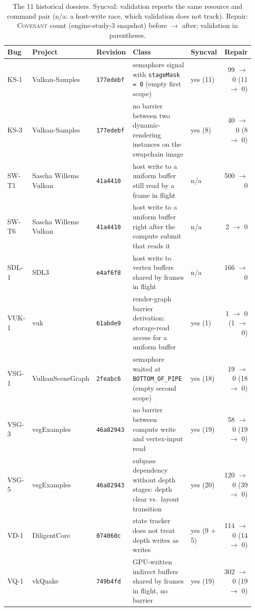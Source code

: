 \documentclass[acmtog,anonymous,review]{acmart}
\newcommand{\sys}{\textsc{Covenant}\xspace}
\newcommand{\code}[1]{\texttt{#1}}
\begin{document}
\begin{table}[t]
\caption{The 11 historical dossiers. Syncval: validation reports the same resource and command pair (n/a: a host-write
race, which validation does not track). Repair: \sys count (engine-study-3 snapshot) before $\to$ after; validation in
parentheses.}
\label{tab:s-dossiers}
\small
\begin{tabular}{@{}lllp{}lr@{}}
\toprule
Bug & Project & Revision & Class & Syncval & Repair \\
\midrule
KS-1 & Vulkan-Samples & \code{177edebf} & semaphore signal with \code{stageMask = 0} (empty first scope) & yes (11) & 99 $\to$ 0 (11 $\to$ 0) \\
KS-3 & Vulkan-Samples & \code{177edebf} & no barrier between two dynamic-rendering instances on the swapchain image & yes (8) & 40 $\to$ 0 (8 $\to$ 0) \\
SW-T1 & Sascha Willems Vulkan & \code{41a4410} & host write to a uniform buffer still read by a frame in flight & n/a & 500 $\to$ 0 \\
SW-T6 & Sascha Willems Vulkan & \code{41a4410} & host write to a uniform buffer right after the compute submit that reads it & n/a & 2 $\to$ 0 \\
SDL-1 & SDL3 & \code{e4af6f8} & host write to vertex buffers shared by frames in flight & n/a & 166 $\to$ 0 \\
VUK-1 & vuk & \code{61abde9} & render-graph barrier derivation: storage-read access for a uniform buffer & yes (1) & 1 $\to$ 0 (1 $\to$ 0) \\
VSG-1 & VulkanSceneGraph & \code{2feabc6} & semaphore waited at \code{BOTTOM\_OF\_PIPE} (empty second scope) & yes (18) & 19 $\to$ 0 (18 $\to$ 0) \\
VSG-3 & vsgExamples & \code{46a82943} & no barrier between compute write and vertex-input read & yes (19) & 58 $\to$ 0 (19 $\to$ 0) \\
VSG-5 & vsgExamples & \code{46a82943} & subpass dependency without depth stages: depth clear vs.\ layout transition & yes (20) & 120 $\to$ 0 (39 $\to$ 0) \\
VD-1 & DiligentCore & \code{074060c} & state tracker does not treat depth writes as writes & yes (9 + 5) & 114 $\to$ 0 (14 $\to$ 0) \\
VQ-1 & vkQuake & \code{749b4fd} & GPU-written indirect buffers shared by frames in flight, no barrier & yes (19) & 302 $\to$ 0 (19 $\to$ 0) \\
\bottomrule
\end{tabular}
\end{table}
\end{document}
